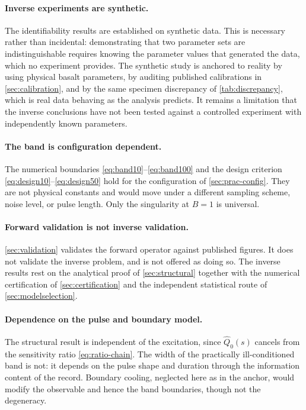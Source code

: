 \documentclass[preprint,12pt,a4paper]{elsarticle}
\theoremstyle{plain}
\theoremstyle{definition}
\theoremstyle{remark}
\newcommand{\Bnum}{B}
\begin{document}
\paragraph{Inverse experiments are synthetic.}
The identifiability results are established on synthetic data. This is
necessary rather than incidental: demonstrating that two parameter sets are
indistinguishable requires knowing the parameter values that generated the
data, which no experiment provides. The synthetic study is anchored to reality
by using physical basalt parameters, by auditing published calibrations in
\cref{sec:calibration}, and by the same specimen discrepancy of
\cref{tab:discrepancy}, which is real data behaving as the analysis predicts.
It remains a limitation that the inverse conclusions have not been tested
against a controlled experiment with independently known parameters.

\paragraph{The band is configuration dependent.}
The numerical boundaries \eqref{eq:band10}--\eqref{eq:band100} and the design
criterion \eqref{eq:design10}--\eqref{eq:design50} hold for the configuration
of \cref{sec:prac-config}. They are not physical constants and would move under
a different sampling scheme, noise level, or pulse length. Only the singularity
at $\Bnum = 1$ is universal.

\paragraph{Forward validation is not inverse validation.}
\cref{sec:validation} validates the forward operator against published figures.
It does not validate the inverse problem, and is not offered as doing so. The
inverse results rest on the analytical proof of \cref{sec:structural} together
with the numerical certification of \cref{sec:certification} and the
independent statistical route of \cref{sec:modelselection}.

\paragraph{Dependence on the pulse and boundary model.}
The structural result is independent of the excitation, since $\hat{Q}_{0}(s)$
cancels from the sensitivity ratio \eqref{eq:ratio-chain}. The width of the
practically ill-conditioned band is not: it depends on the pulse shape and
duration through the information content of the record. Boundary cooling,
neglected here as in the anchor, would modify the observable and hence the band
boundaries, though not the degeneracy.
\end{document}
